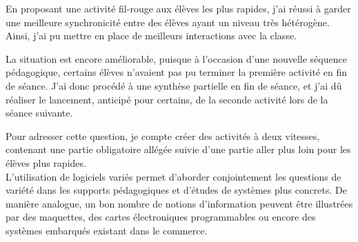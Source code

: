 \documentclass[pdftex,a4paper,12pt]{article}
\begin{document}
	En proposant une activité \og{}fil-rouge\fg{} aux élèves les plus rapides, j'ai réussi à garder une meilleure synchronicité entre des élèves ayant un niveau
	très hétérogène. Ainsi, j'ai pu mettre en place de meilleurs interactions avec la classe.
	
	La situation est encore améliorable, puisque à l'occasion d'une nouvelle séquence pédagogique, 
	certains élèves n'avaient pas pu terminer la première activité en fin de séance.
	J'ai donc procédé à une synthèse partielle en fin de séance, et j'ai dû réaliser le lancement, anticipé pour certains, 
	de la seconde activité lors de la séance suivante.

	Pour adresser cette question, je compte créer des activités \og{}à deux vitesses\fg{}, contenant une partie obligatoire allégée 
	suivie d'une partie \og{}aller plus loin\fg{} pour les élèves plus rapides.\\

	L'utilisation de logiciels variés permet d'aborder conjointement les questions de variété dans les supports pédagogiques et d'études de systèmes plus concrets.
	De manière analogue, un bon nombre de notions d'information peuvent être illustrées par des maquettes, des cartes électroniques programmables 
	ou encore des systèmes embarqués existant dans le commerce.
	
\end{document}
